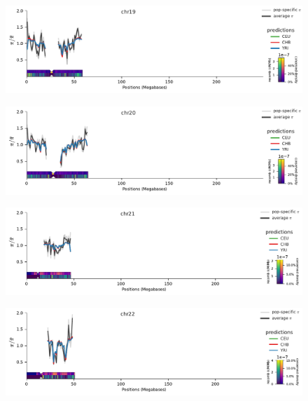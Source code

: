 \documentclass[11pt]{article}
\begin{document}
\begin{figure}[!htb]
  \centering
  \includegraphics[width=\textwidth]{figures/supplementary/pred_plot_chr19.pdf}
  \label{suppfig:fit-chr19}
\end{figure}


\begin{figure}[!htb]
  \centering
  \includegraphics[width=\textwidth]{figures/supplementary/pred_plot_chr20.pdf}
  \label{suppfig:fit-chr20}
\end{figure}


\begin{figure}[!htb]
  \centering
  \includegraphics[width=\textwidth]{figures/supplementary/pred_plot_chr21.pdf}
  \label{suppfig:fit-chr21}
\end{figure}


\begin{figure}[!htb]
  \centering
  \includegraphics[width=\textwidth]{figures/supplementary/pred_plot_chr22.pdf}
  \label{suppfig:fit-chr22}
\end{figure}
\end{document}

